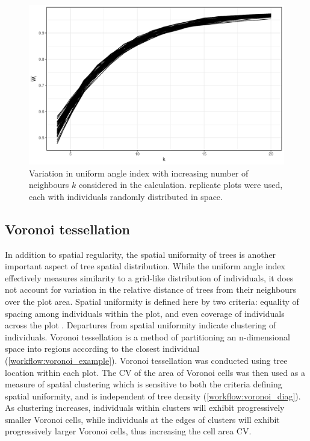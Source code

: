 \begin{refsection}
\begin{figure}
\centering
	\includegraphics[width=\linewidth]{img/wi_k}
	\caption[Behaviour of uniform angle index with increasing number of neighbours considered]{Variation in uniform angle index with increasing number of neighbours $k$ considered in the calculation. \wikn{} replicate plots were used, each with \wiki{} individuals randomly distributed in space.}
	\label{workflow:wi_k}
\end{figure}

\subsection{Voronoi tessellation}

In addition to spatial regularity, the spatial uniformity of trees is another important aspect of tree spatial distribution. While the uniform angle index effectively measures similarity to a grid-like distribution of individuals, it does not account for variation in the relative distance of trees from their neighbours over the plot area. Spatial uniformity is defined here by two criteria: equality of spacing among individuals within the plot, and even coverage of individuals across the plot \citep{Ong2012}. Departures from spatial uniformity indicate clustering of individuals. Voronoi tessellation is a method of partitioning an n-dimensional space into regions according to the closest individual (\autoref{workflow:voronoi_example}). Voronoi tessellation was conducted using tree location within each plot. The CV of the area of Voronoi cells was then used as a measure of spatial clustering which is sensitive to both the criteria defining spatial uniformity, and is independent of tree density (\autoref{workflow:voronoi_diag}). As clustering increases, individuals within clusters will exhibit progressively smaller Voronoi cells, while individuals at the edges of clusters will exhibit progressively larger Voronoi cells, thus increasing the cell area CV.


\end{refsection}

